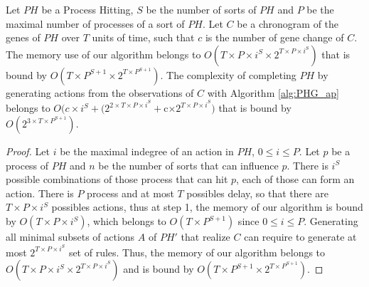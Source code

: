 \begin{theorem}[Complexity]
	\label{th:complexity}
	Let $PH$ be a Process Hitting, $S$ be the number of sorts of $PH$ and $P$ be the maximal number of processes of a sort of $PH$.
	Let $C$ be a chronogram of the genes of $PH$ over $T$ units of time, such that $c$ is the number of gene change of $C$.
	The memory use of our algorithm belongs to $O(T \times  P \times  i^S \times  2^{T\times  P \times  i^S})$ that is bound by $O(T \times  P^{S+1} \times  2^{T\times  P^{S+1}})$.
	The complexity of completing $PH$ by generating actions from the observations of $C$ with Algorithm \ref{alg:PHG_ap} belongs to
	$O(c\times i^S + (2^{2\times T\times  P \times  i^S} + $c$ \times  2^{T\times  P \times  i^S})$ that is bound by $O(2^{3\times T\times P^{S+1}})$.
	\begin{proof}
		Let $i$ be the maximal indegree of an action in $PH$, $0 \leq i \leq P$.
		Let $p$ be a process of $PH$ and $n$ be the number of sorts that can influence $p$.
		There is $i^S$ possible combinations of those process that can hit $p$, each of those can form an action.
		There is $P$ process and at most $T$ possibles delay, so that there are $T\times  P \times  i^S$ possibles actions,
		thus at step 1, the memory of our algorithm is bound by $O(T \times  P \times  i^S)$,
		which belongs to $O(T\times P^{S+1})$ since $0 \leq i \leq P$.
		Generating all minimal subsets of actions $A$ of $PH'$ that realize $C$ can require to generate at most $2^{T\times  P \times  i^S}$ set of rules.
		Thus, the memory of our algorithm belongs to $O(T \times  P \times  i^S \times  2^{T\times  P \times  i^S})$ and is bound by $O(T \times  P^{S+1} \times  2^{T\times  P^{S+1}})$.
		

\end{proof}
\end{theorem}
